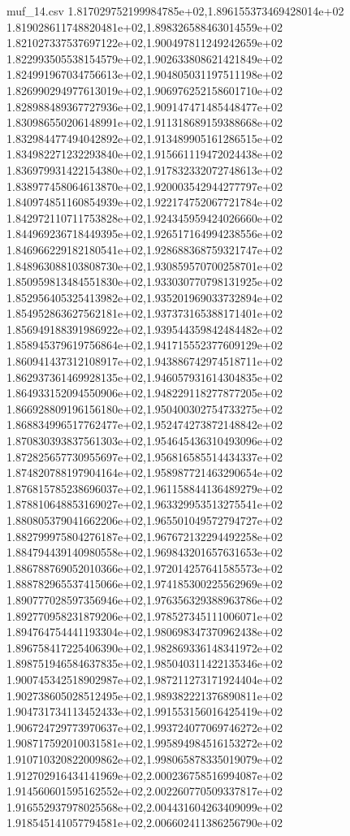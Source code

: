 \begin{filecontents*}{muf_14.csv}
1.817029752199984785e+02,1.896155373469428014e+02
1.819028611748820481e+02,1.898326588463014559e+02
1.821027337537697122e+02,1.900497811249242659e+02
1.822993505538154579e+02,1.902633808621421849e+02
1.824991967034756613e+02,1.904805031197511198e+02
1.826990294977613019e+02,1.906976252158601710e+02
1.828988489367727936e+02,1.909147471485448477e+02
1.830986550206148991e+02,1.911318689159388668e+02
1.832984477494042892e+02,1.913489905161286515e+02
1.834982271232293840e+02,1.915661119472024438e+02
1.836979931422154380e+02,1.917832332072748613e+02
1.838977458064613870e+02,1.920003542944277797e+02
1.840974851160854939e+02,1.922174752067721784e+02
1.842972110711753828e+02,1.924345959424026660e+02
1.844969236718449395e+02,1.926517164994238556e+02
1.846966229182180541e+02,1.928688368759321747e+02
1.848963088103808730e+02,1.930859570700258701e+02
1.850959813484551830e+02,1.933030770798131925e+02
1.852956405325413982e+02,1.935201969033732894e+02
1.854952863627562181e+02,1.937373165388171401e+02
1.856949188391986922e+02,1.939544359842484482e+02
1.858945379619756864e+02,1.941715552377609129e+02
1.860941437312108917e+02,1.943886742974518711e+02
1.862937361469928135e+02,1.946057931614304835e+02
1.864933152094550906e+02,1.948229118277877205e+02
1.866928809196156180e+02,1.950400302754733275e+02
1.868834996517762477e+02,1.952474273872148842e+02
1.870830393837561303e+02,1.954645436310493096e+02
1.872825657730955697e+02,1.956816585514434337e+02
1.874820788197904164e+02,1.958987721463290654e+02
1.876815785238696037e+02,1.961158844136489279e+02
1.878810648853169027e+02,1.963329953513275541e+02
1.880805379041662206e+02,1.965501049572794727e+02
1.882799975804276187e+02,1.967672132294492258e+02
1.884794439140980558e+02,1.969843201657631653e+02
1.886788769052010366e+02,1.972014257641585573e+02
1.888782965537415066e+02,1.974185300225562969e+02
1.890777028597356946e+02,1.976356329388963786e+02
1.892770958231879206e+02,1.978527345111006071e+02
1.894764754441193304e+02,1.980698347370962438e+02
1.896758417225406390e+02,1.982869336148341972e+02
1.898751946584637835e+02,1.985040311422135346e+02
1.900745342518902987e+02,1.987211273171924404e+02
1.902738605028512495e+02,1.989382221376890811e+02
1.904731734113452433e+02,1.991553156016425419e+02
1.906724729773970637e+02,1.993724077069746272e+02
1.908717592010031581e+02,1.995894984516153272e+02
1.910710320822009862e+02,1.998065878335019079e+02
1.912702916434141969e+02,2.000236758516994087e+02
1.914560601595162552e+02,2.002260770509337817e+02
1.916552937978025568e+02,2.004431604263409099e+02
1.918545141057794581e+02,2.006602411386256790e+02

\end{filecontents*}
